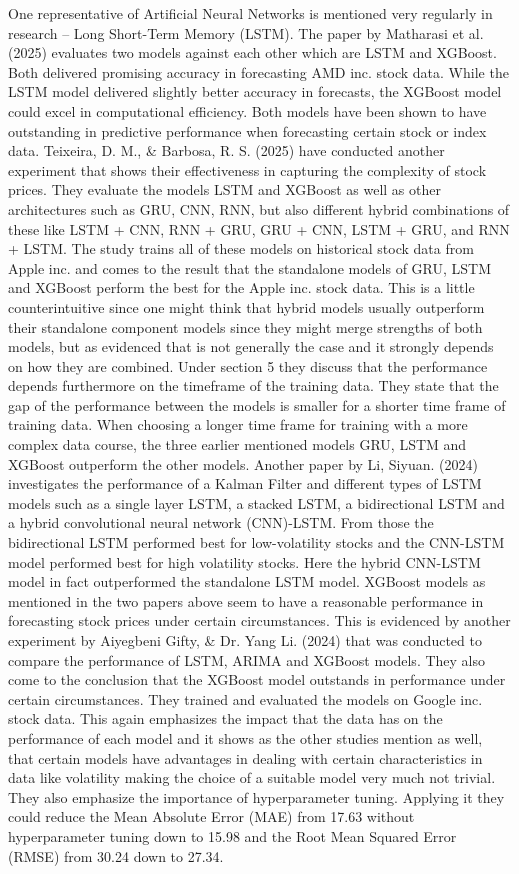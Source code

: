 \documentclass[a4paper,12pt]{report}
\begin{document}
One representative of Artificial Neural Networks is mentioned very regularly in research – Long Short-Term Memory (LSTM). The paper \cite{6} by Matharasi et al. (2025) evaluates two models against each other which are LSTM and XGBoost. Both delivered promising accuracy in forecasting AMD inc. stock data. While the LSTM model delivered slightly better accuracy in forecasts, the XGBoost model could excel in computational efficiency. Both models have been shown to have outstanding in predictive performance when forecasting certain stock or index data. Teixeira, D. M., \& Barbosa, R. S. (2025) have conducted another experiment \cite{13} that shows their effectiveness in capturing the complexity of stock prices. They evaluate the models LSTM and XGBoost as well as other architectures such as GRU, CNN, RNN, but also different hybrid combinations of these like LSTM + CNN, RNN + GRU, GRU + CNN, LSTM + GRU, and RNN + LSTM. The study trains all of these models on historical stock data from Apple inc. and comes to the result that the standalone models of GRU, LSTM and XGBoost perform the best for the Apple inc. stock data. This is a little counterintuitive since one might think that hybrid models usually outperform their standalone component models since they might merge strengths of both models, but as evidenced that is not generally the case and it strongly depends on how they are combined. Under section 5 they discuss that the performance depends furthermore on the timeframe of the training data. They state that the gap of the performance between the models is smaller for a shorter time frame of training data. When choosing a longer time frame for training with a more complex data course, the three earlier mentioned models GRU, LSTM and XGBoost outperform the other models. Another paper \cite{7} by Li, Siyuan. (2024) investigates the performance of a Kalman Filter and different types of LSTM models such as a single layer LSTM, a stacked LSTM, a bidirectional LSTM and a hybrid convolutional neural network (CNN)-LSTM. From those the bidirectional LSTM performed best for low-volatility stocks and the CNN-LSTM model performed best for high volatility stocks. Here the hybrid CNN-LSTM model in fact outperformed the standalone LSTM model. XGBoost models as mentioned in the two papers above seem to have a reasonable performance in forecasting stock prices under certain circumstances. This is evidenced by another experiment \cite{10} by Aiyegbeni Gifty, \& Dr. Yang Li. (2024) that was conducted to compare the performance of LSTM, ARIMA and XGBoost models. They also come to the conclusion that the XGBoost model outstands in performance under certain circumstances. They trained and evaluated the models on Google inc. stock data. This again emphasizes the impact that the data has on the performance of each model and it shows as the other studies mention as well, that certain models have advantages in dealing with certain characteristics in data like volatility making the choice of a suitable model very much not trivial. They also emphasize the importance of hyperparameter tuning. Applying it they could reduce the Mean Absolute Error (MAE) from 17.63 without hyperparameter tuning down to 15.98 and the Root Mean Squared Error (RMSE) from 30.24 down to 27.34.\\
\end{document}
